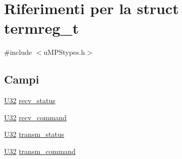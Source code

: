 \hypertarget{structtermreg__t}{\section{Riferimenti per la struct termreg\-\_\-t}
\label{structtermreg__t}
}


{\ttfamily \#include $<$u\-M\-P\-Stypes.\-h$>$}

\subsection*{Campi}
\begin{DoxyCompactItemize}
\item 
\hyperlink{lib_2base_8h_ac3df7cf3c8cb172a588adec881447d68}{U32} \hyperlink{structtermreg__t_adb515c26e4c6508ab1a44cc43a8a91ae}{recv\-\_\-status}
\item 
\hyperlink{lib_2base_8h_ac3df7cf3c8cb172a588adec881447d68}{U32} \hyperlink{structtermreg__t_aaee0ee8a649c4a4792f3ee83350db6ea}{recv\-\_\-command}
\item 
\hyperlink{lib_2base_8h_ac3df7cf3c8cb172a588adec881447d68}{U32} \hyperlink{structtermreg__t_ab3957b0f10a0e492e4e29b90167f513d}{transm\-\_\-status}
\item 
\hyperlink{lib_2base_8h_ac3df7cf3c8cb172a588adec881447d68}{U32} \hyperlink{structtermreg__t_a2b198d43d6df5503425e365297cd5444}{transm\-\_\-command}
\end{DoxyCompactItemize}


